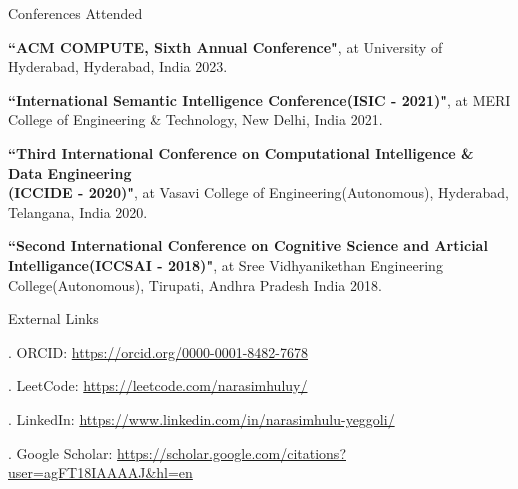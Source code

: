 \documentclass{resume} %
\begin{document}
\begin{rSection}{Conferences Attended}
	
	\begin{rSubsection}{}{}{}{}
		\item \textbf{``ACM COMPUTE, Sixth Annual Conference"}, at University of Hyderabad, Hyderabad, India 2023.
		\item \textbf{``International Semantic Intelligence Conference(ISIC - 2021)"}, at MERI College of Engineering \& Technology, New Delhi, India 2021.
		\item \textbf{``Third International Conference on Computational Intelligence \& Data Engineering\\(ICCIDE - 2020)"}, at Vasavi College of Engineering(Autonomous), Hyderabad, Telangana, India 2020.
		\item \textbf{``Second International Conference on Cognitive Science and Articial Intelligance(ICCSAI - 2018)"}, at Sree Vidhyanikethan Engineering College(Autonomous), Tirupati, Andhra Pradesh India 2018.

	\end{rSubsection}

\end{rSection}

\begin{rSection}{External Links}
	
	\begin{rSubsection}{}{}{}{}	
		\item[.] ORCID: \href{https://orcid.org/0000-0001-8482-7678}{https://orcid.org/0000-0001-8482-7678}
		\item[.] LeetCode: \href{https://leetcode.com/narasimhuluy/}{https://leetcode.com/narasimhuluy/}
		\item[.] LinkedIn: \href{https://www.linkedin.com/in/narasimhulu-yeggoli/}{https://www.linkedin.com/in/narasimhulu-yeggoli/}
		\item[.] Google Scholar: 
		\href{https://scholar.google.com/citations?user=agFT18IAAAAJ\&hl=en}{https://scholar.google.com/citations?user=agFT18IAAAAJ\&hl=en}
		
	\end{rSubsection}	
	
\end{rSection}
\end{document}
